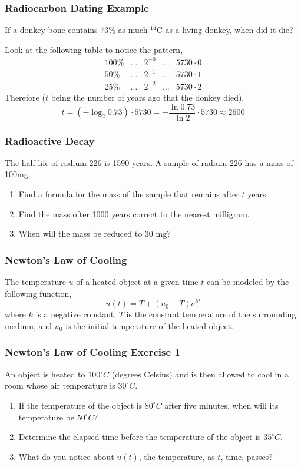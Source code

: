 \documentclass[xcolor=dvipsnames]{beamer}
\begin{document}
\begin{frame}
  \frametitle{Radiocarbon Dating Example}
If a donkey bone contains 73\% as much $^{14}$C as a living donkey,
when did it die?

\medskip

Look at the following table to notice the pattern,
\begin{equation}
  \label{eq:sayeeziu}
  \begin{array}{rcccl}
        100\% & \ldots & 2^{-0} & \ldots & 5730\cdot{}0 \\
        50\% & \ldots & 2^{-1} & \ldots & 5730\cdot{}1 \\
        25\% & \ldots & 2^{-2} & \ldots & 5730\cdot{}2
  \end{array}
\end{equation}
Therefore ($t$ being the number of years ago that the donkey died),
\begin{equation}
  \label{eq:anuvuama}
  t=\left(-\log_{2}0.73\right)\cdot{}5730=-\frac{\ln{}0.73}{\ln{}2}\cdot{}5730\approx{}2600
\end{equation}
\end{frame}

\begin{frame}
  \frametitle{Radioactive Decay}
The half-life of radium-226 is 1590 years. A sample of radium-226 has
a mass of 100mg. 
\begin{enumerate}
\item<1-> Find a formula for the mass of the sample that
remains after $t$ years.
\item<2-> Find the mass ofter 1000 years correct to the nearest
  milligram.
\item<3-> When will the mass be reduced to 30 mg?
\end{enumerate}
\end{frame}

\begin{frame}
  \frametitle{Newton's Law of Cooling}
The temperature $u$ of a heated object at a given time $t$ can be
modeled by the following function,
\begin{equation}
  \label{eq:iemahbec}
  u(t)=T+(u_{0}-T)e^{kt}
\end{equation}
where $k$ is a negative constant, $T$ is the constant temperature of
the surrounding medium, and $u_{0}$ is the initial temperature of the
heated object.
\end{frame}

\begin{frame}
  \frametitle{Newton's Law of Cooling Exercise 1}
An object is heated to 100$^{\circ}C$ (degrees Celsius) and is then
allowed to cool in a room whose air temperature is 30$^{\circ}C$.
\begin{enumerate}
\item<1-> If the temperature of the object is $80^{\circ}C$ after five
  minutes, when will its temperature be $50^{\circ}C$?
\item<2-> Determine the elapsed time before the temperature of the
  object is $35^{\circ}C$.
\item<3-> What do you notice about $u(t)$, the temperature, as $t$,
  time, passes?
\end{enumerate}
\end{frame}
\end{document}
